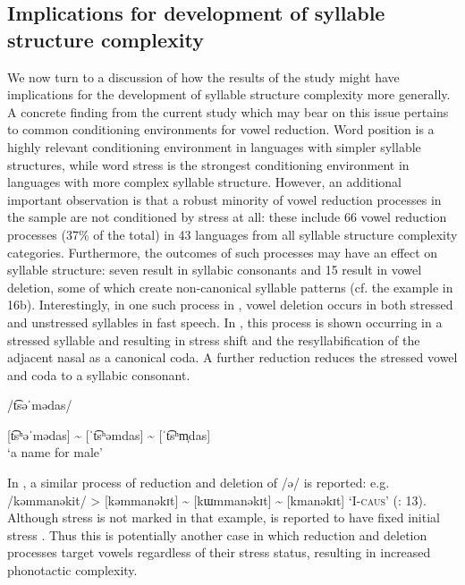\subsection{Implications for development of syllable structure complexity}\label{sec:6.4.2}

  We now turn to a discussion of how the results of the study might have implications for the development of syllable structure complexity more generally. A concrete finding from the current study which may bear on this issue pertains to common conditioning environments for vowel reduction. Word position is a highly relevant conditioning environment in languages with simpler syllable structures, while word stress is the strongest conditioning environment in languages with more complex syllable structure. However, an additional important observation is that a robust minority of vowel reduction processes in the sample are not conditioned by stress at all: these include 66 vowel reduction processes (37\% of the total) in 43 languages from all syllable structure complexity categories. Furthermore, the outcomes of such processes may have an effect on syllable structure: seven result in syllabic consonants and 15 result in vowel deletion, some of which create non-canonical syllable patterns (cf. the  example in 16b). Interestingly, in one such process in , vowel deletion occurs in both stressed and unstressed syllables in fast speech. In , this process is shown occurring in a stressed syllable and resulting in stress shift and the resyllabification of the adjacent nasal as a canonical coda. A further reduction reduces the stressed vowel and coda to a syllabic consonant.

\ea\label{ex:6.21}

/t͡səˈmədas/

[t͡sʰəˈmədas] {\textasciitilde} [ˈt͡sʰəmdas] {\textasciitilde} [ˈt͡sʰm̩das]\\
\glt ‘a name for male’
\citep[42]{Chang2006}
\z

In , a similar process of reduction and deletion of /ə/ is reported: e.g. /kəmmanəkit/ > [kəmmanəkɪt] {\textasciitilde} [kɯmmanəkɪt] {\textasciitilde} [kmanəkɪt] ‘I-\textsc{caus}’ (\citealt{GeorgVolodin1999}: 13). Although stress is not marked in that example,  is reported to have fixed initial stress \citep[6]{Bobaljik2006}. Thus this is potentially another case in which reduction and deletion processes target vowels regardless of their stress status, resulting in increased phonotactic complexity. 

